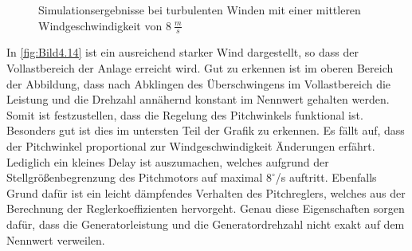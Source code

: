 \begin{figure}[H]
   \centering
   \caption[Simulationsergebnisse bei langsamen turbulenten Winden]{Simulationsergebnisse bei turbulenten Winden mit einer mittleren Windgeschwindigkeit von $\SI{8}{\frac{m}{s}}$}
   \label{fig:Bild4.13}
\end{figure}

In \autoref{fig:Bild4.14} ist ein ausreichend starker Wind dargestellt, so dass der Vollastbereich der Anlage erreicht wird. Gut zu erkennen ist im oberen Bereich der Abbildung, dass nach Abklingen des Überschwingens im Vollastbereich die Leistung und die Drehzahl annähernd konstant im Nennwert gehalten werden. Somit ist festzustellen, dass die Regelung des Pitchwinkels funktional ist. Besonders gut ist dies im untersten Teil der Grafik zu erkennen. Es fällt auf, dass der Pitchwinkel proportional zur Windgeschwindigkeit Änderungen erfährt. Lediglich ein kleines Delay ist auszumachen, welches aufgrund der Stellgrößenbegrenzung des Pitchmotors auf maximal $8^\circ$/s auftritt. Ebenfalls Grund dafür ist ein leicht dämpfendes Verhalten des Pitchreglers, welches aus der Berechnung der Reglerkoeffizienten hervorgeht. Genau diese Eigenschaften sorgen dafür, dass die Generatorleistung und die Generatordrehzahl nicht exakt auf dem Nennwert verweilen.

